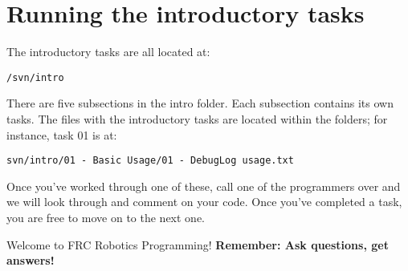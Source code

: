 \documentclass[a4paper]{article}
\begin{document}
\section{Running the introductory tasks}

The introductory tasks are all located at: \begin{verbatim}/svn/intro\end{verbatim}

There are five subsections in the intro folder. Each subsection contains its own tasks. The files with the introductory tasks are located within the folders; for instance, task 01 is at:\begin{verbatim}svn/intro/01 - Basic Usage/01 - DebugLog usage.txt\end{verbatim}

Once you've worked through one of these, call one of the programmers over and we will look through and comment on your code. Once you've completed a task, you are free to move on to the next one. 

Welcome to FRC Robotics Programming! \textbf{Remember: Ask questions, get answers!}
\end{document}
